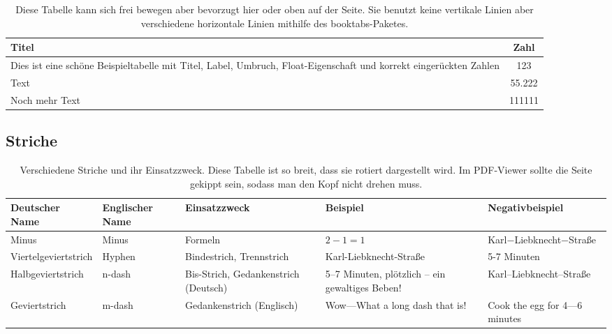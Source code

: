 \begin{table}[ht]
\begin{tabulary}{\textwidth}{LS}
\toprule
Titel									&Zahl\\
\midrule
Dies ist eine schöne Beispieltabelle mit Titel, Label, Umbruch, Float-Eigenschaft und korrekt eingerückten Zahlen	&123\\
Text																												&55.222\\
Noch mehr Text																										&111111\\
\bottomrule
\end{tabulary}
\caption{Diese Tabelle kann sich frei bewegen aber bevorzugt hier oder oben auf der Seite. Sie benutzt keine vertikale Linien aber verschiedene horizontale Linien mithilfe des booktabs-Paketes.}
\label{tab:exampletable}
\end{table}


\begin{landscape}

\section{Striche}

\begin{table}[h]
\begin{tabulary}{\textheight}{LLLLL}
\toprule
Deutscher Name				&Englischer Name	&Einsatzzweck							&Beispiel													&Negativbeispiel\\
\midrule
Minus						&Minus				&Formeln								&$2-1=1$													&Karl$-$Liebknecht$-$Straße\\
Viertelgeviertstrich		&Hyphen				&Bindestrich, Trennstrich				&Karl-Liebknecht-Straße										&5-7 Minuten\\
Halbgeviertstrich			&n-dash				&Bis-Strich, Gedankenstrich (Deutsch)	&5--7 Minuten, plötzlich -- ein gewaltiges Beben! 			&Karl--Liebknecht--Straße\\%
Geviertstrich				&m-dash				&Gedankenstrich (Englisch)				&Wow---What a long dash that is!							&Cook the egg for 4---6 minutes\\
\bottomrule
\end{tabulary}
\caption{Verschiedene Striche und ihr Einsatzzweck. Diese Tabelle ist so breit, dass sie rotiert dargestellt wird. Im PDF-Viewer sollte die Seite gekippt sein, sodass man den Kopf nicht drehen muss.}
\label{tab:dashes}
\end{table}

\end{landscape}


